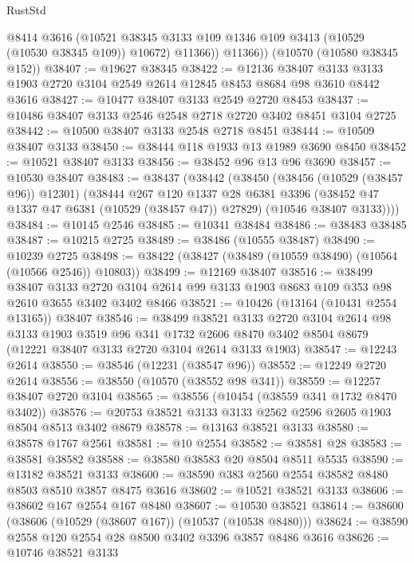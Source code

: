 \begin{lexlean}{RustStd}
\begin{coremodule}
            @8414
            @3616
            (@10521 @38345 @3133 @109 @1346 @109 @3413 (@10529 (@10530 @38345 @109)) @10672)
            @11366))
        @11366))
    (@10570 (@10580 @38345 @152))
@38407 := @19627 @38345
@38422 := @12136
    @38407
    @3133
    @3133
    @1903
    @2720
    @3104
    @2549
    @2614
    @12845
    @8453
    @8684
    @98
    @3610
    @8442
    @3616
@38427 := @10477 @38407 @3133 @2549 @2720 @8453
@38437 := @10486 @38407 @3133 @2546 @2548 @2718 @2720 @3402 @8451 @3104 @2725
@38442 := @10500 @38407 @3133 @2548 @2718 @8451
@38444 := @10509 @38407 @3133
@38450 := @38444 @118 @1933 @13 @1989 @3690 @8450
@38452 := @10521 @38407 @3133
@38456 := @38452 @96 @13 @96 @3690
@38457 := @10530 @38407
@38483 := @38437
    (@38442
      (@38450
        (@38456 (@10529 (@38457 @96)) @12301)
        (@38444
          @267
          @120
          @1337
          @28
          @6381
          @3396
          (@38452 @47 @1337 @47 @6381 (@10529 (@38457 @47)) @27829)
          (@10546 @38407 @3133))))
@38484 := @10145 @2546
@38485 := @10341 @38484
@38486 := @38483 @38485
@38487 := @10215 @2725
@38489 := @38486 (@10555 @38487)
@38490 := @10239 @2725
@38498 := @38422 (@38427 (@38489 (@10559 @38490) (@10564 (@10566 @2546)) @10803))
@38499 := @12169 @38407
@38516 := @38499
    @38407
    @3133
    @2720
    @3104
    @2614
    @99
    @3133
    @1903
    @8683
    @109
    @353
    @98
    @2610
    @3655
    @3402
    @3402
    @8466
@38521 := @10426 (@13164 (@10431 @2554 @13165)) @38407
@38546 := @38499
    @38521
    @3133
    @2720
    @3104
    @2614
    @98
    @3133
    @1903
    @3519
    @96
    @341
    @1732
    @2606
    @8470
    @3402
    @8504
    @8679
    (@12221 @38407 @3133 @2720 @3104 @2614 @3133 @1903)
@38547 := @12243 @2614
@38550 := @38546 (@12231 (@38547 @96))
@38552 := @12249 @2720 @2614
@38556 := @38550 (@10570 (@38552 @98 @341))
@38559 := @12257 @38407 @2720 @3104
@38565 := @38556 (@10454 (@38559 @341 @1732 @8470 @3402))
@38576 := @20753 @38521 @3133 @3133 @2562 @2596 @2605 @1903 @8504 @8513 @3402 @8679
@38578 := @13163 @38521 @3133
@38580 := @38578 @1767 @2561
@38581 := @10 @2554
@38582 := @38581 @28
@38583 := @38581 @38582
@38588 := @38580 @38583 @20 @8504 @8511 @5535
@38590 := @13182 @38521 @3133
@38600 := @38590 @383 @2560 @2554 @38582 @8480 @8503 @8510 @3857 @8475 @3616
@38602 := @10521 @38521 @3133
@38606 := @38602 @167 @2554 @167 @8480
@38607 := @10530 @38521
@38614 := @38600 (@38606 (@10529 (@38607 @167)) (@10537 (@10538 @8480)))
@38624 := @38590 @2558 @120 @2554 @28 @8500 @3402 @3396 @3857 @8486 @3616
@38626 := @10746 @38521 @3133

\end{coremodule}
\end{lexlean}
